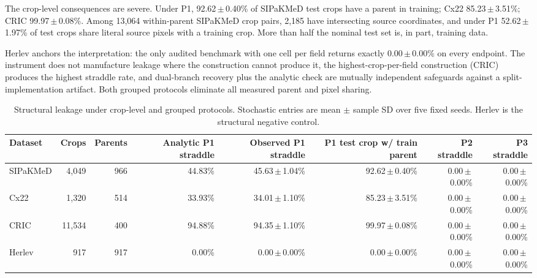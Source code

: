 \documentclass[conference]{IEEEtran}
\newcommand{\meanpm}[2]{#1\,$\pm$\,#2}
\newcommand{\protocol}[1]{\textsf{#1}}
\begin{document}
The crop-level consequences are severe.
Under \protocol{P1}, \meanpm{92.62}{0.40}\% of SIPaKMeD test crops have a parent in training; Cx22 \meanpm{85.23}{3.51}\%; CRIC \meanpm{99.97}{0.08}\%.
Among 13,064 within-parent SIPaKMeD crop pairs, 2,185 have intersecting source coordinates, and under \protocol{P1} \meanpm{52.62}{1.97}\% of test crops share literal source pixels with a training crop.
More than half the nominal test set is, in part, training data.

Herlev anchors the interpretation: the only audited benchmark with one cell per field returns exactly \meanpm{0.00}{0.00}\% on every endpoint.
The instrument does not manufacture leakage where the construction cannot produce it, the highest-crop-per-field construction (CRIC) produces the highest straddle rate, and dual-branch recovery plus the analytic check are mutually independent safeguards against a split-implementation artifact.
Both grouped protocols eliminate all measured parent and pixel sharing.

\begin{table}[t]
\caption{Structural leakage under crop-level and grouped protocols. Stochastic entries are mean $\pm$ sample SD over five fixed seeds. Herlev is the structural negative control.}
\label{tab:structural}
\centering
\scriptsize
\setlength{\tabcolsep}{5.2pt}
\begin{tabular}{lrrrrrrr}
\toprule
Dataset & Crops & Parents & Analytic \protocol{P1} straddle & Observed \protocol{P1} straddle & \protocol{P1} test crop w/ train parent & \protocol{P2} straddle & \protocol{P3} straddle \\
\midrule
SIPaKMeD & 4,049 & 966 & 44.83\% & \meanpm{45.63}{1.04}\% & \meanpm{92.62}{0.40}\% & \meanpm{0.00}{0.00}\% & \meanpm{0.00}{0.00}\% \\
Cx22 & 1,320 & 514 & 33.93\% & \meanpm{34.01}{1.10}\% & \meanpm{85.23}{3.51}\% & \meanpm{0.00}{0.00}\% & \meanpm{0.00}{0.00}\% \\
CRIC & 11,534 & 400 & 94.88\% & \meanpm{94.35}{1.10}\% & \meanpm{99.97}{0.08}\% & \meanpm{0.00}{0.00}\% & \meanpm{0.00}{0.00}\% \\
Herlev & 917 & 917 & 0.00\% & \meanpm{0.00}{0.00}\% & \meanpm{0.00}{0.00}\% & \meanpm{0.00}{0.00}\% & \meanpm{0.00}{0.00}\% \\
\bottomrule
\end{tabular}
\end{table}
\end{document}
